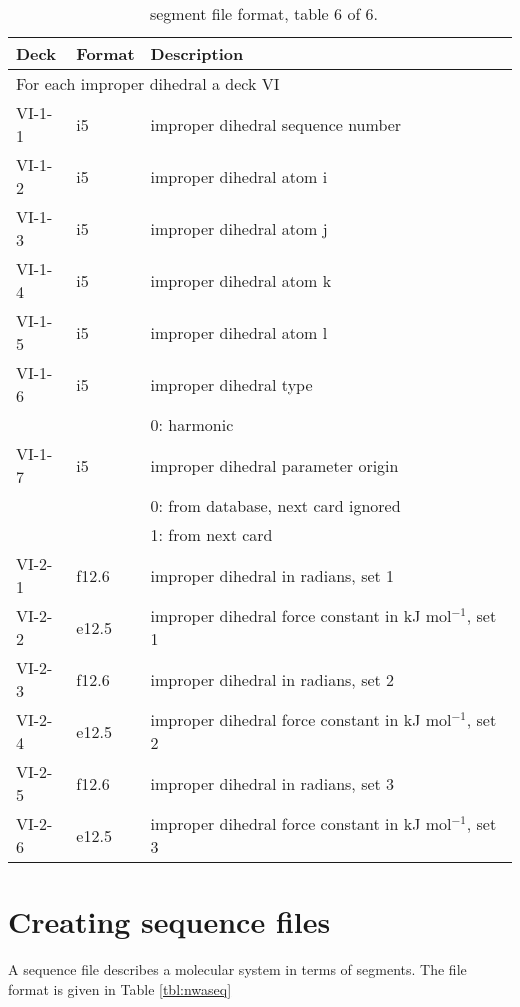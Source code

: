 \begin{table}[htbp]
\begin{center}
\begin{tabular*}{150mm}{p{12mm}p{12mm}l}
\hline\hline
Deck & Format & Description \\ \hline
\multicolumn{3}{l}{For each improper dihedral a deck VI} \\
VI-1-1 & i5     & improper dihedral sequence number \\
VI-1-2 & i5     & improper dihedral atom i \\
VI-1-3 & i5     & improper dihedral atom j \\
VI-1-4 & i5     & improper dihedral atom k \\
VI-1-5 & i5     & improper dihedral atom l \\
VI-1-6 & i5     & improper dihedral type \\
       &        & 0: harmonic\\
VI-1-7 & i5     & improper dihedral parameter origin\\
       &        & 0: from database, next card ignored \\
       &        & 1: from next card\\
VI-2-1 & f12.6  & improper dihedral in radians, set 1\\
VI-2-2 & e12.5  & improper dihedral force constant in kJ mol$^{-1}$, set 1 \\
VI-2-3 & f12.6  & improper dihedral in radians, set 2\\
VI-2-4 & e12.5  & improper dihedral force constant in kJ mol$^{-1}$, set 2 \\
VI-2-5 & f12.6  & improper dihedral in radians, set 3\\
VI-2-6 & e12.5  & improper dihedral force constant in kJ mol$^{-1}$, set 3 \\
\hline\hline
\end{tabular*}
\caption{\nwargos\ segment file format, table 6 of 6.\label{tbl:nwaseg6}}
\end{center}
\end{table}


\section{Creating sequence files}
A sequence file describes a molecular system in terms of segments. The
file format is given in Table \ref{tbl:nwaseq}

